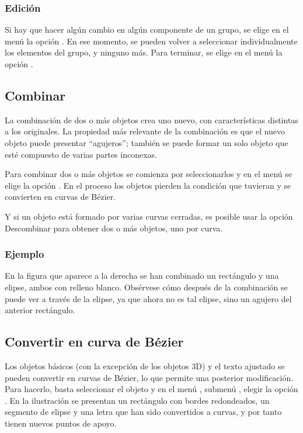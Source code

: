 \subsubsection{Edición}

Si hay que hacer algún cambio en algún componente de un grupo, se
elige en el menú  la opción . En
ese momento, se pueden volver a seleccionar individualmente los
elementos del grupo, y ninguno más. Para terminar, se elige en el menú
 la opción .

\subsection{Combinar}

La combinación de dos o más objetos crea uno nuevo, con
características distintas a los originales. La propiedad más relevante
de la combinación es que el nuevo objeto puede presentar ``agujeros'';
también se puede formar un solo objeto que esté compuesto de varias
partes inconexas.

Para combinar dos o más objetos se comienza por seleccionarlos y en el
menú  se elige la opción . En el
proceso los objetos pierden la condición que tuvieran y se convierten
en curvas de Bézier.

Y si un objeto está formado por varias curvas cerradas, es posible
usar la opción Descombinar para obtener dos o más objetos, uno por
curva.

\subsubsection{Ejemplo}

En la figura que aparece a la derecha se han combinado un rectángulo y
una elipse, ambos con relleno blanco. Obsérvese cómo después de la
combinación se puede ver a través de la elipse, ya que ahora no es tal
elipse, sino un agujero del anterior rectángulo.

\subsection{Convertir en curva de Bézier}

Los objetos básicos (con la excepción de los objetos 3D) y el texto
ajustado se pueden convertir en curvas de Bézier, lo que permite una
posterior modificación. Para hacerlo, basta seleccionar el objeto y en
el menú , submenú , elegir la opción
. En la ilustración se presentan un rectángulo con
bordes redondeados, un segmento de elipse y una letra que han sido
convertidos a curvas, y por tanto tienen nuevos puntos de apoyo.

